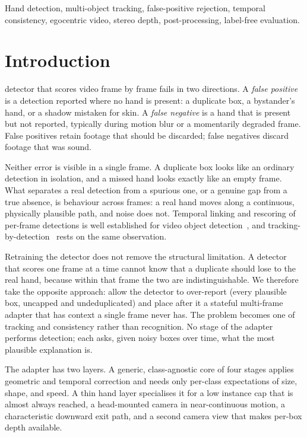 \documentclass[journal]{IEEEtran}
\begin{document}
\begin{IEEEkeywords}
Hand detection, multi-object tracking, false-positive rejection, temporal consistency, egocentric video, stereo depth, post-processing, label-free evaluation.
\end{IEEEkeywords}

\section{Introduction}
 detector that scores video frame by frame fails in two directions. A \emph{false positive} is a detection reported where no hand is present: a duplicate box, a bystander's hand, or a shadow mistaken for skin. A \emph{false negative} is a hand that is present but not reported, typically during motion blur or a momentarily degraded frame. False positives retain footage that should be discarded; false negatives discard footage that was sound.

Neither error is visible in a single frame. A duplicate box looks like an ordinary detection in isolation, and a missed hand looks exactly like an empty frame. What separates a real detection from a spurious one, or a genuine gap from a true absence, is behaviour across frames: a real hand moves along a continuous, physically plausible path, and noise does not. Temporal linking and rescoring of per-frame detections is well established for video object detection~\cite{han2016seqnms,kang2018tcnn}, and tracking-by-detection~\cite{bewley2016sort} rests on the same observation.

Retraining the detector does not remove the structural limitation. A detector that scores one frame at a time cannot know that a duplicate should lose to the real hand, because within that frame the two are indistinguishable. We therefore take the opposite approach: allow the detector to over-report (every plausible box, uncapped and undeduplicated) and place after it a stateful multi-frame adapter that has context a single frame never has. The problem becomes one of tracking and consistency rather than recognition. No stage of the adapter performs detection; each asks, given noisy boxes over time, what the most plausible explanation is.

The adapter has two layers. A generic, class-agnostic core of four stages applies geometric and temporal correction and needs only per-class expectations of size, shape, and speed. A thin hand layer specialises it for a low instance cap that is almost always reached, a head-mounted camera in near-continuous motion, a characteristic downward exit path, and a second camera view that makes per-box depth available.
\end{document}

